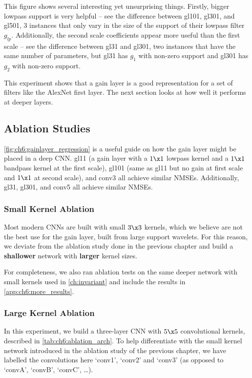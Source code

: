 This figure shows several interesting yet unsurprising things. Firstly,
bigger lowpass support is very helpful -- see the difference between gl101,
gl301, and gl501, 3 instances that only vary in the size of the support of their
lowpass filter $g_{lp}$. Additionally, the second scale coefficients appear more
useful than the first scale -- see the difference between gl31 and gl301, two
instances that have the same number of parameters, but gl31 has $g_1$ with
non-zero support and gl301 has $g_2$ with non-zero support.

This experiment shows that a gain layer is a good representation for a set of
filters like the AlexNet first layer. The next section looks at how well it
performs at deeper layers.

\subsection{Ablation Studies}\label{sec:ch6:ablation}
\autoref{fig:ch6:gainlayer_regression} is a useful guide on how the gain layer
might be placed in a deep CNN. gl11 (a gain layer with a $1\x1$ lowpass kernel
and a $1\x1$ bandpass kernel at the first scale), gl101 (same as gl11 but no
gain at first scale and $1\x 1$ at second scale), and conv3 all achieve similar
NMSEs. Additionally, gl31, gl301, and conv5 all achieve similar NMSEs.

\subsubsection{Small Kernel Ablation}
Most modern CNNs are built with small $3\x 3$ kernels, which we believe are not the best
use for the gain layer, built from large support wavelets. For this reason, we
deviate from the ablation study done in the previous chapter and build a
\textbf{shallower} network with \textbf{larger} kernel sizes.

For completeness, we also ran ablation tests on the same deeper network
with small kernels used in \autoref{ch:invariant} and include the results in
\autoref{app:ch6:more_results}.

\renewcommand{\_}{\textscale{.6}{\textunderscore}}
\subsubsection{Large Kernel Ablation}


In this experiment, we build a three-layer CNN with $5\x 5$ convolutional
kernels, described in \autoref{tab:ch6:ablation_arch}.  To help differentiate
with the small kernel network introduced in the ablation study of the previous
chapter, we have labelled the convolutions here `conv1', `conv2' and `conv3' (as
opposed to `convA', `convB', `convC', \ldots).


